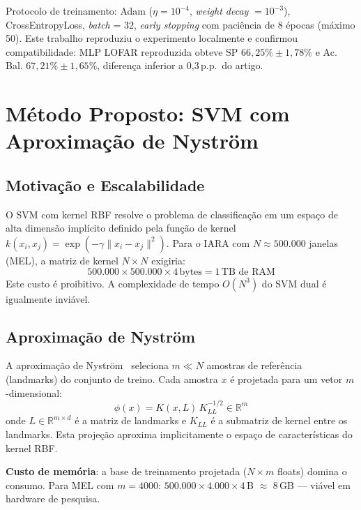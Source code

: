 \documentclass[a4paper,12pt]{article}
\begin{document}
Protocolo de treinamento: Adam ($\eta=10^{-4}$, \textit{weight decay} $=10^{-3}$), CrossEntropyLoss, \textit{batch} = 32, \textit{early stopping} com paciência de 8 épocas (máximo 50). Este trabalho reproduziu o experimento localmente e confirmou compatibilidade: MLP LOFAR reproduzida obteve SP $66{,}25\% \pm 1{,}78\%$ e Ac. Bal. $67{,}21\% \pm 1{,}65\%$, diferença inferior a 0,3\,p.p.\ do artigo.

\section{Método Proposto: SVM com Aproximação de Nyström}

\subsection{Motivação e Escalabilidade}

O SVM com kernel RBF resolve o problema de classificação em um espaço de alta dimensão implícito definido pela função de kernel $k(x_i, x_j) = \exp(-\gamma \|x_i - x_j\|^2)$. Para o IARA com $N \approx 500.000$ janelas (MEL), a matriz de kernel $N \times N$ exigiria:
\begin{equation}
    500.000 \times 500.000 \times 4\,\text{bytes} = 1\,\text{TB de RAM}
\end{equation}
Este custo é proibitivo. A complexidade de tempo $O(N^3)$ do SVM dual é igualmente inviável.

\subsection{Aproximação de Nyström}

A aproximação de Nyström~\cite{nystrom} seleciona $m \ll N$ amostras de referência (landmarks) do conjunto de treino. Cada amostra $x$ é projetada para um vetor $m$-dimensional:
\begin{equation}
    \phi(x) = K(x, L) \, K_{LL}^{-1/2} \in \mathbb{R}^m
\end{equation}
onde $L \in \mathbb{R}^{m \times d}$ é a matriz de landmarks e $K_{LL}$ é a submatriz de kernel entre os landmarks. Esta projeção aproxima implicitamente o espaço de características do kernel RBF.

\textbf{Custo de memória}: a base de treinamento projetada ($N \times m$ floats) domina o consumo. Para MEL com $m=4000$: $500.000 \times 4.000 \times 4$\,B $\approx$ 8\,GB — viável em hardware de pesquisa.
\end{document}

